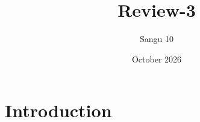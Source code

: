 \documentclass{article}
\title{Review-3}
\author{Sangu 10}
\date{October 2026}
\begin{document}
\maketitle

\section{Introduction}
\end{document}
